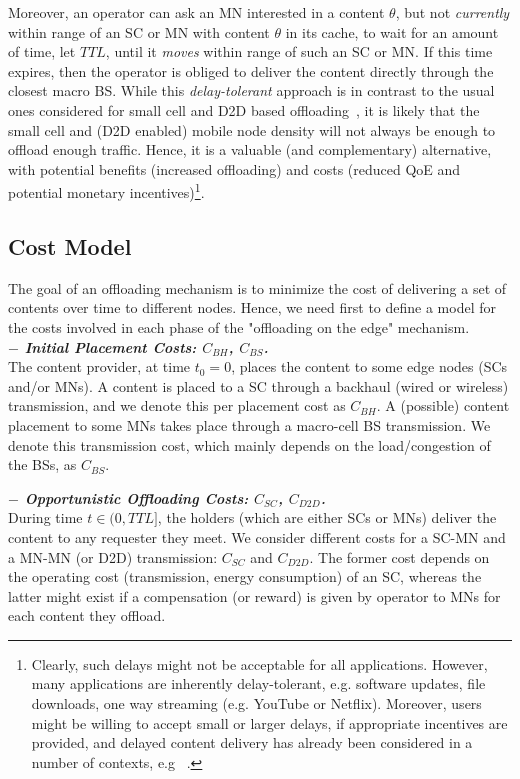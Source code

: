 \documentclass[10pt,conference,letterpaper]{IEEEtran}
\begin{document}
Moreover, an operator can ask an MN interested in a content $\theta$, but not \emph{currently} within range of an SC or MN with content $\theta$ in its cache, to wait for an amount of time, let $TTL$, until it \emph{moves} within range of such an SC or MN. If this time expires, then the operator is obliged to deliver the content directly through the closest macro BS. While this \textit{delay-tolerant} approach is in contrast to the usual ones considered for small cell and D2D based offloading~\cite{femtocaching,caire-d2d-caching-limits,poularakis-video-HetNets}, it is likely that the small cell and (D2D enabled) mobile node density will not always be enough to offload enough traffic. Hence, it is a valuable (and complementary) alternative, with potential benefits (increased offloading) and costs (reduced QoE and potential monetary incentives)\footnote{Clearly, such delays might not be acceptable for all applications. However, many applications are inherently delay-tolerant, e.g. software updates, file downloads, one way streaming (e.g. YouTube or Netflix). Moreover, users might be willing to accept small or larger delays, if appropriate incentives are provided, and delayed content delivery has already been considered in a number of contexts, e.g~\cite{tube,push-to-peer}
.}.


\subsection{Cost Model}\label{sec:cost-model}
The goal of an offloading mechanism is to minimize the cost of delivering a set of contents over time to different nodes. Hence, we need first to define a model for the costs involved in each phase of the "offloading on the edge" mechanism.\\
\noindent \textbf{\textit{$-$ Initial Placement Costs: $C_{BH}$, $C_{BS}$.}}\\
The content provider, at time $t_{0}=0$, places the content to some edge nodes (SCs and/or MNs). A content is placed to a SC through a backhaul (wired or wireless) transmission, and we denote this per placement cost as $C_{BH}$. A (possible) content placement to some MNs takes place through a macro-cell BS transmission. We denote this transmission cost, which mainly depends on the load/congestion of the BSs, as $C_{BS}$.

\noindent \textbf{\textit{$-$ Opportunistic Offloading Costs:  $C_{SC}$, $C_{D2D}$.}}\\
During time $t\in(0,TTL]$, the holders (which are either SCs or MNs) deliver the content to any requester they meet. We consider different costs for a SC-MN and a MN-MN (or D2D) transmission: $C_{SC}$ and $C_{D2D}$. The former cost depends on the operating cost (transmission, energy consumption) of an SC, whereas the latter might exist if a compensation (or reward) is given by operator to MNs for each content they offload.
\end{document}
